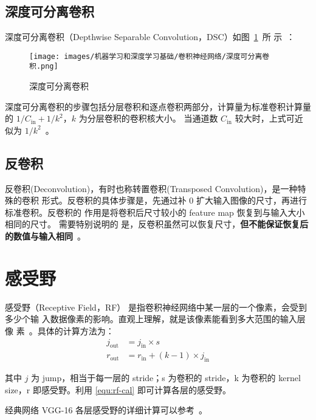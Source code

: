 \subsection{深度可分离卷积}

深度可分离卷积（Depthwise Separable Convolution，DSC）如图~\ref{fig:ds-conv}~所
示~：

\begin{figure}[ht]
  \centering
  \texttt{[image: images/机器学习和深度学习基础/卷积神经网络/深度可分离卷积.png]}
  \caption{深度可分离卷积}
  \label{fig:ds-conv}
\end{figure}

深度可分离卷积的步骤包括分层卷积和逐点卷积两部分，计算量为标准卷积计算量的 $ 1 /
C_{\mathrm{in}} + 1/k^2 $，$k$ 为分层卷积的卷积核大小。
当通道数 $C_{\mathrm{in}}$ 较大时，上式可近似为 $1 / k^2$~。

\subsection{反卷积}
\label{subsec:deconv}

反卷积(Deconvolution)，有时也称转置卷积(Transposed Convolution)，是一种特殊的卷积
形式。反卷积的具体步骤是，先通过补 0 扩大输入图像的尺寸，再进行标准卷积。反卷积的
作用是将卷积后尺寸较小的 feature map 恢复到与输入大小相同的尺寸。 需要特别说明的
是，反卷积虽然可以恢复尺寸，\textbf{但不能保证恢复后的数值与输入相同}~。

\section{感受野}

感受野（Receptive Field，RF） 是指卷积神经网络中某一层的一个像素，会受到多少个输
入数据像素的影响。直观上理解，就是该像素能看到多大范围的输入层像
素~。具体的计算方法为：
\begin{align}
\label{equ:rf-cal}
j_{\mathrm {out}} & = j_{\mathrm{in}} \times s \\
r_{\mathrm {out}} & = r_{\mathrm{in}} + (k-1) \times j_{\mathrm{in}}
\end{align}

其中 $j$ 为 jump，相当于每一层的 stride；s 为卷积的 stride，k 为卷积的 kernel
size，r 即感受野。利用 \eqref{equ:rf-cal} 即可计算各层的感受野。

经典网络 VGG-16 各层感受野的详细计算可以参考~。

